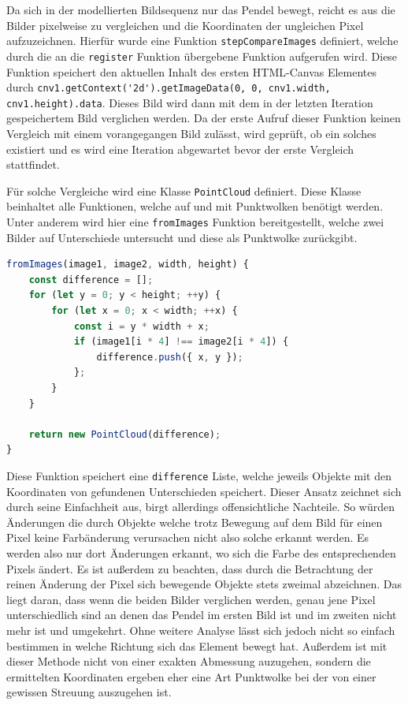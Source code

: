 Da sich in der modellierten Bildsequenz nur das Pendel bewegt, reicht es aus die Bilder pixelweise zu vergleichen und die Koordinaten der ungleichen Pixel aufzuzeichnen.
Hierfür wurde eine Funktion \lstinline{stepCompareImages} definiert, welche durch die an die \lstinline{register} Funktion übergebene Funktion aufgerufen wird.
Diese Funktion speichert den aktuellen Inhalt des ersten HTML-Canvas Elementes durch \lstinline{cnv1.getContext('2d').getImageData(0, 0, cnv1.width, cnv1.height).data}.
Dieses Bild wird dann mit dem in der letzten Iteration gespeichertem Bild verglichen werden.
Da der erste Aufruf dieser Funktion keinen Vergleich mit einem vorangegangen Bild zulässt, wird geprüft, ob ein solches existiert und es wird eine Iteration abgewartet bevor der erste Vergleich stattfindet.

Für solche Vergleiche wird eine Klasse \lstinline{PointCloud} definiert.
Diese Klasse beinhaltet alle Funktionen, welche auf und mit Punktwolken benötigt werden.
Unter anderem wird hier eine \lstinline{fromImages} Funktion bereitgestellt, welche zwei Bilder auf Unterschiede untersucht und diese als Punktwolke zurückgibt.

\begin{lstlisting}[language=JavaScript, caption={Definition der \lstinline{fromImages} Funktion, welche eine statische Funktion der \lstinline{PointCloud} Klasse darstellt.}, label={lst:PointCloud}]
fromImages(image1, image2, width, height) {
    const difference = [];
    for (let y = 0; y < height; ++y) {
        for (let x = 0; x < width; ++x) {
            const i = y * width + x;
            if (image1[i * 4] !== image2[i * 4]) {
                difference.push({ x, y });
            };
        }
    }

    return new PointCloud(difference);
}
\end{lstlisting}

Diese Funktion speichert eine \lstinline{difference} Liste, welche jeweils Objekte mit den Koordinaten von gefundenen Unterschieden speichert.
Dieser Ansatz zeichnet sich durch seine Einfachheit aus, birgt allerdings offensichtliche Nachteile.
So würden Änderungen die durch Objekte welche trotz Bewegung auf dem Bild für einen Pixel keine Farbänderung verursachen nicht also solche erkannt werden.
Es werden also nur dort Änderungen erkannt, wo sich die Farbe des entsprechenden Pixels ändert.
Es ist au{\ss}erdem zu beachten, dass durch die Betrachtung der reinen Änderung der Pixel sich bewegende Objekte stets zweimal abzeichnen.
Das liegt daran, dass wenn die beiden Bilder verglichen werden, genau jene Pixel unterschiedlich sind an denen das Pendel im ersten Bild ist und im zweiten nicht mehr ist und umgekehrt.
Ohne weitere Analyse lässt sich jedoch nicht so einfach bestimmen in welche Richtung sich das Element bewegt hat.
Au{\ss}erdem ist mit dieser Methode nicht von einer exakten Abmessung auzugehen, sondern die ermittelten Koordinaten ergeben eher eine Art Punktwolke bei der von einer gewissen Streuung auszugehen ist.

